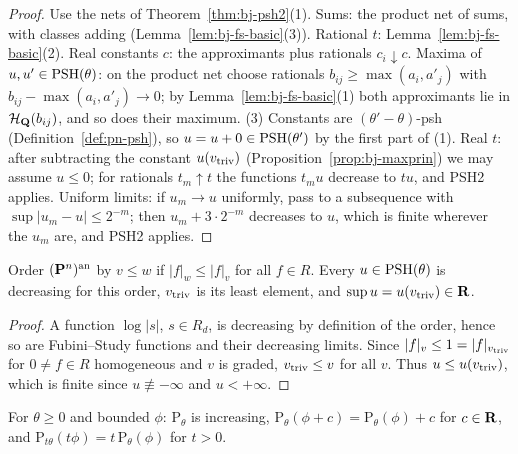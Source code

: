 \begin{proof}
Use the nets of Theorem~\ref{thm:bj-psh2}(1). Sums: the product net of sums, with classes adding
(Lemma~\ref{lem:bj-fs-basic}(3)). Rational $t$: Lemma~\ref{lem:bj-fs-basic}(2). Real constants $c$: the
approximants plus rationals $c_i\downarrow c$. Maxima of $u,u'\in\operatorname{PSH}(\theta)$: on the product net choose
rationals $b_{ij}\ge\max(a_i,a'_j)$ with $b_{ij}-\max(a_i,a'_j)\to0$; by Lemma~\ref{lem:bj-fs-basic}(1)
both approximants lie in $\mathcal H_{\mathbf{Q}}(b_{ij})$, and so does their maximum. (3) Constants are
$(\theta'-\theta)$-psh (Definition~\ref{def:pn-psh}), so $u=u+0\in\operatorname{PSH}(\theta')$ by the first part of (1). Real $t$: after subtracting the constant $u(v_{\mathrm{triv}})$
(Proposition~\ref{prop:bj-maxprin}) we may assume $u\le0$; for rationals $t_m\uparrow t$ the functions
$t_mu$ decrease to $tu$, and PSH2 applies. Uniform limits: if $u_m\to u$ uniformly, pass to a subsequence with $\sup|u_m-u|\le2^{-m}$; then
$u_m+3\cdot2^{-m}$ decreases to $u$, which is finite wherever the $u_m$ are, and PSH2 applies.
\end{proof}

\begin{proposition}\label{prop:bj-maxprin}
\leanok
{}
Order $(\mathbf{P}^n)^{\mathrm{an}}$ by $v\le w$ if $|f|_w\le|f|_v$ for all $f\in R$. Every $u\in\operatorname{PSH}(\theta)$ is
decreasing for this order, $v_{\mathrm{triv}}$ is its least element, and $\sup u=u(v_{\mathrm{triv}})\in\mathbf{R}$.
\end{proposition}

\begin{proof}
A function $\log|s|$, $s\in R_d$, is decreasing by definition of the order, hence so are Fubini--Study
functions and their decreasing limits. Since $|f|_v\le1=|f|_{v_{\mathrm{triv}}}$ for $0\ne f\in R$ homogeneous and $v$
is graded, $v_{\mathrm{triv}}\le v$ for all $v$. Thus $u\le u(v_{\mathrm{triv}})$, which is finite since $u\not\equiv-\infty$
and $u<+\infty$.
\end{proof}

\begin{lemma}\label{lem:bj-env-basic}
\leanok
{}
For $\theta\ge0$ and bounded $\phi$: $\mathrm P_\theta$ is increasing,
$\mathrm P_\theta(\phi+c)=\mathrm P_\theta(\phi)+c$ for $c\in\mathbf{R}$, and
$\mathrm P_{t\theta}(t\phi)=t\,\mathrm P_\theta(\phi)$ for $t>0$.
\end{lemma}

